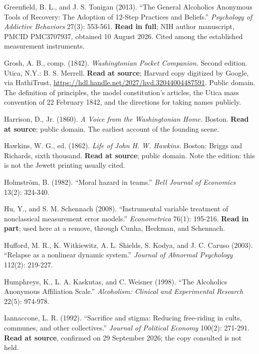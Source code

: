 \documentclass[11pt,a4paper]{article}
\begin{document}
\begin{list}{}{\setlength{\leftmargin}{1.5em}\setlength{\itemindent}{-1.5em}\setlength{\itemsep}{2pt}}
\item Greenfield, B. L., and J. S. Tonigan (2013). ``The General Alcoholics Anonymous Tools of Recovery: The Adoption of 12-Step Practices and Beliefs.'' \textit{Psychology of Addictive Behaviors} 27(3): 553-561. \textbf{Read in full}; NIH author manuscript, PMCID PMC3707937, obtained 10 August 2026. Cited among the established measurement instruments.

\item Grosh, A. B., comp. (1842). \textit{Washingtonian Pocket Companion.} Second edition. Utica, N.Y.: B. S. Merrell. \textbf{Read at source}; Harvard copy digitized by Google, via HathiTrust, \url{https://hdl.handle.net/2027/hvd.32044004487591}. Public domain. The definition of principles, the model constitution's articles, the Utica mass convention of 22 February 1842, and the directions for taking names publicly.

\item Harrison, D., Jr. (1860). \textit{A Voice from the Washingtonian Home.} Boston. \textbf{Read at source}; public domain. The earliest account of the founding scene.

\item Hawkins, W. G., ed. (1862). \textit{Life of John H. W. Hawkins.} Boston: Briggs and Richards, sixth thousand. \textbf{Read at source}; public domain. Note the edition: this is not the Jewett printing usually cited.

\item Holmstr\"om, B. (1982). ``Moral hazard in teams.'' \textit{Bell Journal of Economics} 13(2): 324-340.

\item Hu, Y., and S. M. Schennach (2008). ``Instrumental variable treatment of nonclassical measurement error models.'' \textit{Econometrica} 76(1): 195-216. \textbf{Read in part}; used here at a remove, through Cunha, Heckman, and Schennach.

\item Hufford, M. R., K. Witkiewitz, A. L. Shields, S. Kodya, and J. C. Caruso (2003). ``Relapse as a nonlinear dynamic system.'' \textit{Journal of Abnormal Psychology} 112(2): 219-227.

\item Humphreys, K., L. A. Kaskutas, and C. Weisner (1998). ``The Alcoholics Anonymous Affiliation Scale.'' \textit{Alcoholism: Clinical and Experimental Research} 22(5): 974-978.

\item Iannaccone, L. R. (1992). ``Sacrifice and stigma: Reducing free-riding in cults, communes, and other collectives.'' \textit{Journal of Political Economy} 100(2): 271-291. \textbf{Read at source}, confirmed on 29 September 2026; the copy consulted is not held.


\end{list}
\end{document}
